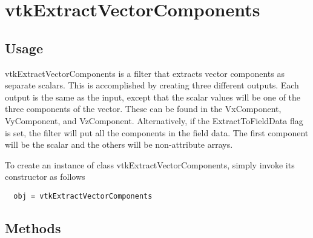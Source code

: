 \section{vtkExtractVectorComponents}

\subsection{Usage}

 vtkExtractVectorComponents is a filter that extracts vector components as
 separate scalars. This is accomplished by creating three different outputs.
 Each output is the same as the input, except that the scalar values will be
 one of the three components of the vector. These can be found in the
 VxComponent, VyComponent, and VzComponent.
 Alternatively, if the ExtractToFieldData flag is set, the filter will
 put all the components in the field data. The first component will be
 the scalar and the others will be non-attribute arrays.

To create an instance of class vtkExtractVectorComponents, simply
invoke its constructor as follows
\begin{verbatim}
  obj = vtkExtractVectorComponents
\end{verbatim}
\subsection{Methods}

